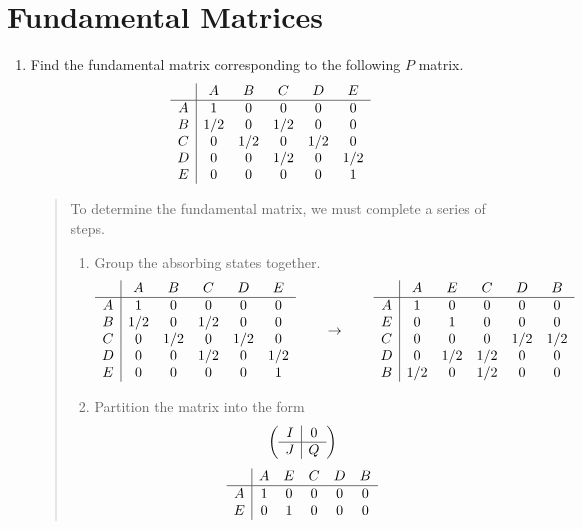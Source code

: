 \documentclass{hw}
\begin{document}
\section*{Fundamental Matrices}
\begin{enumerate}
\item Find the fundamental matrix corresponding to the following $P$ matrix.
\[
\begin{array}{c | c c c c c}
& A & B & C & D & E\\
\hline
A & 1 & 0 & 0 & 0 & 0\\
B & 1/2 & 0 & 1/2 & 0 & 0\\
C & 0 & 1/2 & 0 & 1/2 & 0\\
D & 0 & 0 & 1/2 & 0 & 1/2\\
E & 0 & 0 & 0 & 0 & 1
\end{array}
\]
\begin{quote}
To determine the fundamental matrix, we must complete a series of steps.
\begin{enumerate}
\item Group the absorbing states together.
\[
\begin{array}{c | c c c c c}
& A & B & C & D & E\\
\hline
A & 1 & 0 & 0 & 0 & 0\\
B & 1/2 & 0 & 1/2 & 0 & 0\\
C & 0 & 1/2 & 0 & 1/2 & 0\\
D & 0 & 0 & 1/2 & 0 & 1/2\\
E & 0 & 0 & 0 & 0 & 1
\end{array}
\qquad\to\qquad
\begin{array}{c | c c c c c}
& A & E & C & D & B\\
\hline
A & 1 & 0 & 0 & 0 & 0\\
E & 0 & 1 & 0 & 0 & 0\\
C & 0 & 0 & 0 & 1/2 & 1/2\\
D & 0 & 1/2 & 1/2 & 0 & 0\\
B & 1/2 & 0 & 1/2 & 0 & 0
\end{array}
\]
\item Partition the matrix into the form
\[
\left(
\begin{array}{c | c}
I & 0\\
\hline
J & Q
\end{array}
\right)
\]
\[
\begin{array}{c | c c c c c}
& A & E & C & D & B\\
\hline
A & 1 & 0 & 0 & 0 & 0\\
E & 0 & 1 & 0 & 0 & 0\\

\end{array}\]
\end{enumerate}
\end{quote}
\end{enumerate}
\end{document}
